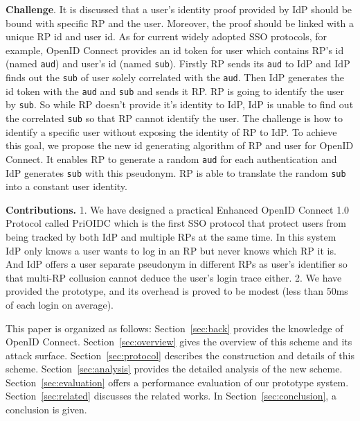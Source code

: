 \textbf{Challenge}. 
It is discussed that a user's identity proof provided by IdP should be bound with specific RP and the user\cite{rfc6749}\cite{ChenPCTKT14}\cite{WangZLG16}. Moreover, the proof should be linked with a unique RP id and user id. As for current widely adopted SSO protocols, for example, OpenID Connect provides an id token for user which contains RP's id (named \verb+aud+) and user's id (named \verb+sub+). 
Firstly RP sends its \verb+aud+ to IdP and IdP finds out the \verb+sub+ of user solely correlated with the \verb+aud+. Then IdP generates the id token with the \verb+aud+ and \verb+sub+ and sends it RP. RP is going to identify the user by \verb+sub+. 
So while RP doesn't provide it's identity to IdP, IdP is unable to find out the correlated \verb+sub+ so that RP cannot identify the user. 
The challenge is how to identify a specific user without exposing the identity of RP to IdP.
To achieve this goal, we propose the new id generating algorithm of RP and user for OpenID Connect. It enables RP to generate a random \verb+aud+ for each authentication and IdP generates \verb+sub+ with this pseudonym. RP is able to translate the random \verb+sub+ into a constant user identity.  

\textbf{Contributions.} 
1. We have designed a practical Enhanced OpenID Connect 1.0 Protocol called PriOIDC which is the first SSO protocol that protect users from being tracked by both IdP and multiple RPs at the same time. 
In this system IdP only knows a user wants to log in an RP but never knows which RP it is. 
And IdP offers a user separate pseudonym in different RPs as user's identifier so that multi-RP collusion cannot deduce the user's login trace either.
2. We have provided the prototype, and its overhead is proved to be modest (less than 50ms of each login on average). 

This paper is organized as follows: Section~\ref{sec:back} provides the knowledge of OpenID Connect. Section~\ref{sec:overview} gives the overview of this scheme and its attack surface. Section~\ref{sec:protocol} describes the construction and details of this scheme. Section~\ref{sec:analysis} provides the detailed analysis of the new scheme. Section~\ref{sec:evaluation} offers a performance evaluation of our prototype system. Section~\ref{sec:related} discusses the related works. In Section~\ref{sec:conclusion}, a conclusion is given.



